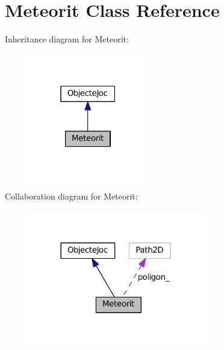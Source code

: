 \hypertarget{class_meteorit}{}\section{Meteorit Class Reference}
\label{class_meteorit}


Inheritance diagram for Meteorit\+:\nopagebreak
\begin{figure}[H]
\begin{center}
\leavevmode
\includegraphics[width=147pt]{class_meteorit__inherit__graph}
\end{center}
\end{figure}


Collaboration diagram for Meteorit\+:\nopagebreak
\begin{figure}[H]
\begin{center}
\leavevmode
\includegraphics[width=216pt]{class_meteorit__coll__graph}
\end{center}
\end{figure}
